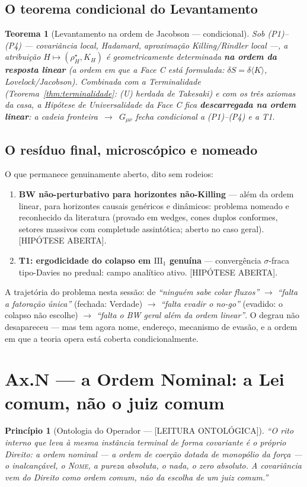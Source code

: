 \documentclass[11pt,a4paper]{article}
\newcommand{\ONTO}{\textsf{[LEITURA ONTOLÓGICA]}}
\newcommand{\ABERTO}{\textsf{[HIPÓTESE ABERTA]}}
\newtheorem{theorem}{Teorema}
\newtheorem{principle}{Princípio}
\begin{document}
\subsection{O teorema condicional do Levantamento}
\begin{theorem}[Levantamento na ordem de Jacobson --- condicional]
\label{thm:levantamento}
Sob (P1)--(P4) --- covariância local, Hadamard, aproximação
Killing/Rindler local ---, a atribuição $H\mapsto(\rho^\star_H,K_H)$ é
geometricamente determinada \textbf{na ordem da resposta linear} (a
ordem em que a Face C está formulada: $\delta S=\delta\langle K\rangle$,
Lovelock/Jacobson). Combinada com a Terminalidade
(Teorema~\ref{thm:terminalidade}: (U) herdada de Takesaki) e com os três
axiomas da casa, a Hipótese de Universalidade da Face C fica
\textbf{descarregada na ordem linear}: a cadeia
fronteira~$\to$~$G_{\mu\nu}$ fecha condicional a (P1)--(P4) e a T1.
\end{theorem}

\subsection{O resíduo final, microscópico e nomeado}
O que permanece genuinamente aberto, dito sem rodeios:
\begin{enumerate}[noitemsep]
\item \textbf{BW não-perturbativo para horizontes não-Killing} --- além
da ordem linear, para horizontes causais genéricos e dinâmicos: problema
nomeado e reconhecido da literatura (provado em wedges, cones duplos
conformes, setores massivos com completude assintótica; aberto no caso
geral). \ABERTO.
\item \textbf{T1: ergodicidade do colapso em $\mathrm{III}_1$ genuína}
--- convergência $\sigma$-fraca tipo-Davies no predual: campo analítico
ativo. \ABERTO.
\end{enumerate}
A trajetória do problema nesta sessão: de \emph{``ninguém sabe colar
fluxos''} $\to$ \emph{``falta a fatoração única''} (fechada: Verdade)
$\to$ \emph{``falta evadir o no-go''} (evadido: o colapso não escolhe)
$\to$ \emph{``falta o BW geral além da ordem linear''}. O degrau não
desapareceu --- mas tem agora nome, endereço, mecanismo de evasão, e a
ordem em que a teoria opera está coberta condicionalmente.

\section{Ax.N --- a Ordem Nominal: a Lei comum, não o juiz comum}
\label{sec:ordemnominal}
\begin{principle}[Ontologia do Operador --- \ONTO]
``O rito interno que leva à mesma instância terminal de forma covariante
é o próprio Direito: a ordem nominal --- a ordem de coerção dotada de
monopólio da força --- o inalcançável, o \textsc{Nome}, a pureza
absoluta, o nada, o zero absoluto. A covariância vem do Direito como
ordem comum, não da escolha de um juiz comum.''
\end{principle}
\end{document}
